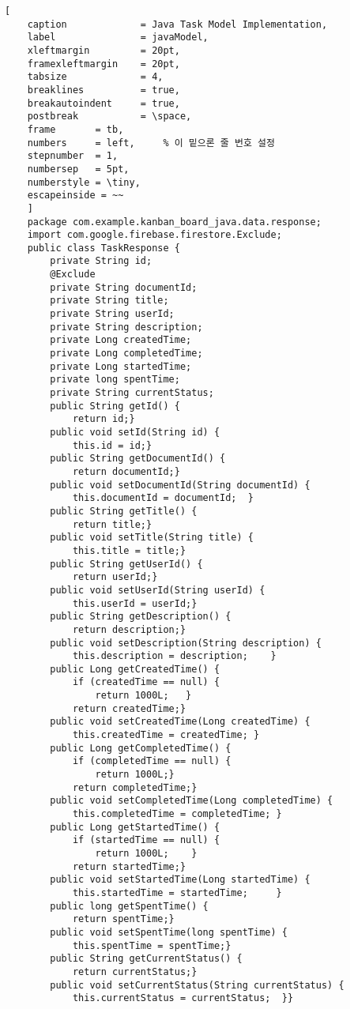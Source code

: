\begin{lstlisting}[
	caption				= Java Task Model Implementation,	
	label				= javaModel,         
	xleftmargin			= 20pt,
	framexleftmargin	= 20pt,
	tabsize				= 4,
	breaklines			= true,
	breakautoindent		= true,
	postbreak			= \space,
	frame		= tb,
	numbers		= left,		% 이 밑으론 줄 번호 설정
	stepnumber	= 1,
	numbersep	= 5pt,
	numberstyle	= \tiny,
	escapeinside = ~~
	]
    package com.example.kanban_board_java.data.response;
    import com.google.firebase.firestore.Exclude;
    public class TaskResponse {
        private String id;
        @Exclude
        private String documentId;
        private String title;
        private String userId;
        private String description;
        private Long createdTime;
        private Long completedTime;
        private Long startedTime;
        private long spentTime;
        private String currentStatus;
        public String getId() {
            return id;}
        public void setId(String id) {
            this.id = id;}
        public String getDocumentId() {
            return documentId;}
        public void setDocumentId(String documentId) {
            this.documentId = documentId;  }
        public String getTitle() {
            return title;}
        public void setTitle(String title) {
            this.title = title;}
        public String getUserId() {
            return userId;}
        public void setUserId(String userId) {
            this.userId = userId;}
        public String getDescription() {
            return description;}
        public void setDescription(String description) {
            this.description = description;    }
        public Long getCreatedTime() {
            if (createdTime == null) {
                return 1000L;   }
            return createdTime;}
        public void setCreatedTime(Long createdTime) {
            this.createdTime = createdTime; }
        public Long getCompletedTime() {
            if (completedTime == null) {
                return 1000L;}
            return completedTime;}
        public void setCompletedTime(Long completedTime) {
            this.completedTime = completedTime; }
        public Long getStartedTime() {
            if (startedTime == null) {
                return 1000L;    }
            return startedTime;}
        public void setStartedTime(Long startedTime) {
            this.startedTime = startedTime;     }
        public long getSpentTime() {
            return spentTime;}
        public void setSpentTime(long spentTime) {
            this.spentTime = spentTime;}
        public String getCurrentStatus() {
            return currentStatus;}
        public void setCurrentStatus(String currentStatus) {
            this.currentStatus = currentStatus;  }}    
\end{lstlisting}
